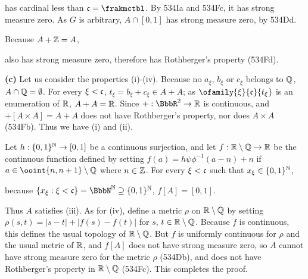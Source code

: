 {

\noindent has cardinal less than $\frak c=\frakmctbl$.   By 534Ia
and 534Fc, it has
strong measure zero.   As $G$ is arbitrary, $A\cap[0,1]$ has strong
measure zero, by 534Dd.\ \Qed

Because $A+\Bbb Z=A$,


\noindent also has strong measure zero, therefore has Rothberger's
property (534Fd).

\medskip

{\bf (c)} Let us consider the properties (i)-(iv).   Because no
$a_{\xi}$, $b_{\xi}$ or $c_{\xi}$ belongs to $\Bbb Q$,
$A\cap\Bbb Q=\emptyset$.   For every $\xi<\frak c$,
$t_{\xi}=b_{\xi}+c_{\xi}\in A+A$;  as
$\ofamily{\xi}{\frak c}{t_{\xi}}$
is an enumeration of $\Bbb R$, $A+A=\Bbb R$.   Since
$+:\BbbR^2\to\Bbb R$ is continuous, and $+[A\times A]=A+A$
does not have Rothberger's property, nor does $A\times A$ (534Fb).
Thus we have (i) and (ii).

Let $h:\{0,1\}^{\Bbb N}\to[0,1]$ be a continuous surjection, and let
$f:\Bbb R\setminus\Bbb Q\to\Bbb R$ be the continuous
function
defined by setting $f(a)=h\psi\phi^{-1}(a-n)+n$ if
$a\in\ooint{n,n+1}\setminus\Bbb Q$ where $n\in\Bbb Z$.   For every
$\xi<\frak c$ such that $x_{\xi}\in\{0,1\}^{\Bbb N}$,


\noindent because
$\{x_{\xi}:\xi<\frak c\}=\NN\supseteq\{0,1\}^{\Bbb N}$, $f[A]=[0,1]$.

Thus $A$ satisfies (iii).   As for (iv), define a metric $\rho$ on
$\Bbb R\setminus\Bbb Q$ by setting $\rho(s,t)=|s-t|+|f(s)-f(t)|$ for
$s$, $t\in\Bbb R\setminus\Bbb Q$.   Because $f$ is continuous, this
defines the usual topology of $\Bbb R\setminus\Bbb Q$.   But $f$ is
uniformly continuous for $\rho$ and the usual metric of $\Bbb R$, and
$f[A]$ does not have strong measure zero, so $A$ cannot have strong
measure zero for the metric $\rho$ (534Db), and does not have Rothberger's
property in $\Bbb R\setminus\Bbb Q$ (534Fc).   This completes the proof.
}%


